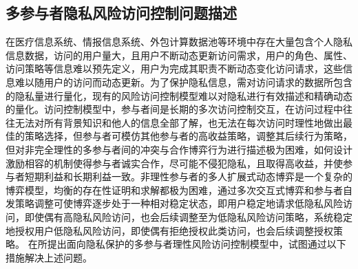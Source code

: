 \subsection{多参与者隐私风险访问控制问题描述}
\label{subsec:issues}
在医疗信息系统、情报信息系统、外包计算数据池等环境中存在大量包含个人隐私信息数据，访问的用户量大，且用户不断动态更新访问需求，用户的角色、属性、访问策略等信息难以预先定义，用户为完成其职责不断动态变化访问请求，这些信息难以随用户的访问而动态更新。为了保护隐私信息，需对访问请求的数据所包含的隐私量进行量化，现有的风险访问控制模型难以对隐私进行有效描述和精确动态的量化。访问控制模型中，参与者间是长期的多次访问控制交互，在访问过程中往往无法对所有背景知识和他人的信息全部了解，也无法在每次访问时理性地做出最佳的策略选择，但参与者可模仿其他参与者的高收益策略，调整其后续行为策略，但对非完全理性的多参与者间的冲突与合作博弈行为进行描述极为困难，如何设计激励相容的机制使得参与者诚实合作，尽可能不侵犯隐私，且取得高收益，并使参与者短期利益和长期利益一致。非理性参与者的多人扩展式动态博弈是一个复杂的博弈模型，均衡的存在性证明和求解都极为困难，通过多次交互式博弈和参与者自发策略调整可使博弈逐步处于一种相对稳定状态，即用户稳定地请求低隐私风险访问，即使偶有高隐私风险访问，也会后续调整至为低隐私风险访问策略，系统稳定地授权用户低隐私风险访问，即使偶有拒绝授权此类访问，也会后续调整授权策略。
在所提出面向隐私保护的多参与者理性风险访问控制模型中，试图通过以下措施解决上述问题。
